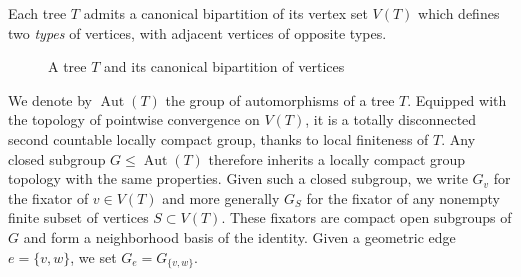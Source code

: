\documentclass[11pt]{amsart}
\numberwithin{equation}{section}
\DeclareMathOperator{\Aut}{Aut}
\theoremstyle{definition}
\begin{document}
Each tree $T$ admits a canonical bipartition of its vertex set $V(T)$ which defines two \emph{types} of vertices, with adjacent vertices of opposite types. 
\begin{figure}[htbp]
    \centering
    \caption{A tree $T$ and its canonical bipartition of vertices}
    \label{fig:tree-bipartition}
\end{figure}

We denote by $\Aut(T)$ the group of automorphisms of a tree $T$. Equipped with the topology of pointwise convergence on $V(T)$, it is a totally disconnected second countable locally compact group, thanks to local finiteness of $T$. Any closed subgroup $G\leq \Aut(T)$ therefore inherits a locally compact group topology with the same properties. Given such a closed subgroup, we write $G_v$ for the fixator of $v\in V(T)$ and more generally $G_S$ for the fixator of any nonempty finite subset of vertices $S\subset V(T)$. These fixators are compact open subgroups of $G$ and form a neighborhood basis of the identity. Given a geometric edge $e=\{v,w\}$, we set $G_e=G_{\{v,w\}}$.
\end{document}
